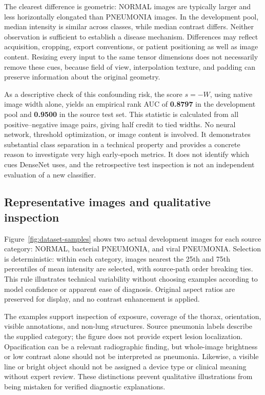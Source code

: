 \documentclass[12pt,letterpaper]{article}
\begin{document}
The clearest difference is geometric: NORMAL images are typically larger and less horizontally elongated than PNEUMONIA images. In the development pool, median intensity is similar across classes, while median contrast differs. Neither observation is sufficient to establish a disease mechanism. Differences may reflect acquisition, cropping, export conventions, or patient positioning as well as image content. Resizing every input to the same tensor dimensions does not necessarily remove these cues, because field of view, interpolation texture, and padding can preserve information about the original geometry.

As a descriptive check of this confounding risk, the score $s=-W$, using native image width alone, yields an empirical rank AUC of \textbf{0.8797} in the development pool and \textbf{0.9500} in the source test set. This statistic is calculated from all positive--negative image pairs, giving half credit to tied widths. No neural network, threshold optimization, or image content is involved. It demonstrates substantial class separation in a technical property and provides a concrete reason to investigate very high early-epoch metrics. It does not identify which cues DenseNet uses, and the retrospective test inspection is not an independent evaluation of a new classifier.


\subsection{Representative images and qualitative inspection}
Figure~\ref{fig:dataset-samples} shows two actual development images for each source category: NORMAL, bacterial PNEUMONIA, and viral PNEUMONIA. Selection is deterministic: within each category, images nearest the 25th and 75th percentiles of mean intensity are selected, with source-path order breaking ties. This rule illustrates technical variability without choosing examples according to model confidence or apparent ease of diagnosis. Original aspect ratios are preserved for display, and no contrast enhancement is applied.

The examples support inspection of exposure, coverage of the thorax, orientation, visible annotations, and non-lung structures. Source pneumonia labels describe the supplied category; the figure does not provide expert lesion localization. Opacification can be a relevant radiographic finding, but whole-image brightness or low contrast alone should not be interpreted as pneumonia. Likewise, a visible line or bright object should not be assigned a device type or clinical meaning without expert review. These distinctions prevent qualitative illustrations from being mistaken for verified diagnostic explanations.
\end{document}
